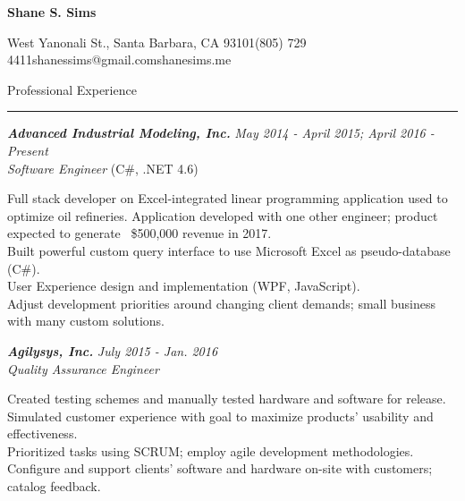 \documentclass[10pt]{article}
\newcommand{\simsbullet}{{\raisebox{2pt}{\tiny $\bullet$}}\hspace{8pt}}
\newcommand{\midlinesimsbullet}{\hspace{4pt}{\raisebox{2pt}{\tiny $\bullet$}}\hspace{5pt}}
\begin{document}

{\centerline{\huge\bf\sffamily Shane S. Sims}}
\vskip 8pt
{\centerline{ West Yanonali St., Santa Barbara, CA 93101{\midlinesimsbullet}(805) 729 4411{\midlinesimsbullet}shanessims@gmail.com{\midlinesimsbullet}shanesims.me}}

\vskip 14pt




{\Large\sffamily Professional Experience}
\vskip 2pt
\hrule
\vskip 6pt

{\bfseries\itshape\sffamily Advanced Industrial Modeling, Inc.} \hfill \textsf{\textit{May 2014 - April 2015; April 2016 - Present}} \\
\textit{\textsf{Software Engineer}} (C\#, .NET 4.6)
\vskip 4pt

\setlength{\leftskip}{16pt}

Full stack developer on Excel-integrated linear programming application used to optimize oil refineries. 
\vskip 4pt
\simsbullet Application developed with one other engineer; product expected to generate ~\$500,000 revenue in 2017. \\
\simsbullet Built powerful custom query interface to use Microsoft Excel as pseudo-database (C\#). \\
\simsbullet User Experience design and implementation (WPF, JavaScript). \\
\simsbullet Adjust development priorities around changing client demands; small business with many custom solutions. 

\setlength{\leftskip}{0pt}

\vskip 8pt

{\bfseries\itshape\sffamily Agilysys, Inc.} \hfill \textsf{\textit{July 2015 - Jan. 2016}} \\
\textit{\textsf{Quality Assurance Engineer}}
\vskip 4pt

\setlength{\leftskip}{16pt}

Created testing schemes and manually tested hardware and software for release.
\vskip 4pt
\simsbullet Simulated customer experience with goal to maximize products' usability and effectiveness. \\
\simsbullet Prioritized tasks using SCRUM; employ agile development methodologies. \\
\simsbullet Configure and support clients' software and hardware on-site with customers; catalog feedback.
\end{document}
